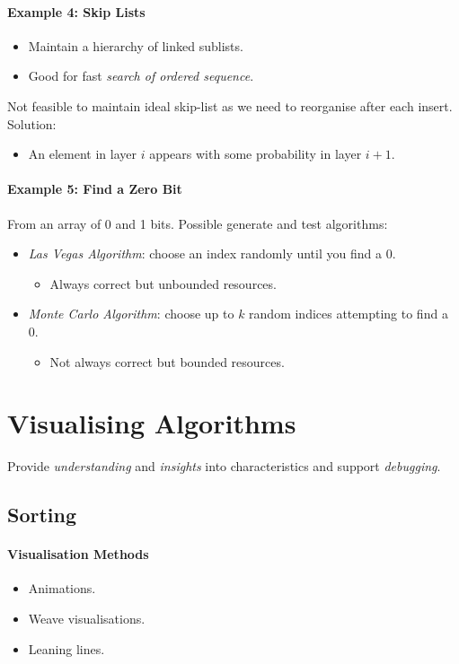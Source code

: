 \documentclass[twocolumn,english]{article}
\numberwithin{equation}{section}
\numberwithin{figure}{section}
\numberwithin{table}{section}
\begin{document}
\paragraph{Example 4: Skip Lists}
\begin{itemize}
\item Maintain a hierarchy of linked sublists.
\item Good for fast \emph{search of ordered sequence}.
\end{itemize}
Not feasible to maintain ideal skip-list as we need to reorganise
after each insert. Solution:
\begin{itemize}
\item An element in layer $i$ appears with some probability in layer $i+1$.
\end{itemize}

\paragraph{Example 5: Find a Zero Bit}

From an array of 0 and 1 bits. Possible generate and test algorithms:
\begin{itemize}
\item \emph{Las Vegas Algorithm}: choose an index randomly until you find
a 0.
\begin{itemize}
\item Always correct but unbounded resources.
\end{itemize}
\item \emph{Monte Carlo Algorithm}: choose up to $k$ random indices attempting
to find a 0.
\begin{itemize}
\item Not always correct but bounded resources.
\end{itemize}
\end{itemize}

\section{Visualising Algorithms}

Provide \emph{understanding} and \emph{insights} into characteristics
and support \emph{debugging}.

\subsection{Sorting}

\paragraph{Visualisation Methods}
\begin{itemize}
\item Animations.
\item Weave visualisations.
\item Leaning lines.
\end{itemize}
\end{document}
